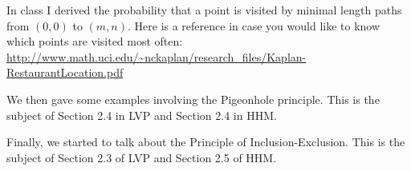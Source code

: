 \documentclass[11pt]{article}
\begin{document}
In class I derived the probability that a point is visited by minimal length  paths from $(0,0)$ to $(m,n)$.  Here is a reference in case you would like to know which points are visited most often:\\
\url{http://www.math.uci.edu/~nckaplan/research_files/Kaplan-RestaurantLocation.pdf}

We then gave some examples involving the Pigeonhole principle.  This is the subject of Section 2.4 in LVP and Section 2.4 in HHM.  

Finally, we started to talk about the Principle of Inclusion-Exclusion.  This is the subject of Section 2.3 of LVP and Section 2.5 of HHM.


\newpage

\end{document}
